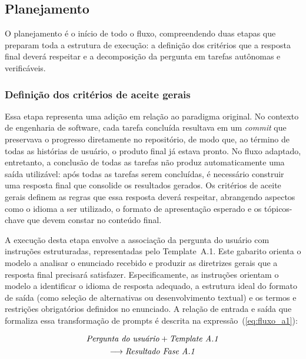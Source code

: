 \documentclass[a4paper,10pt,twocolumn]{article}
\begin{document}
\subsection{Planejamento}

O planejamento é o início de todo o fluxo, compreendendo duas etapas que preparam toda a estrutura de execução: a definição dos critérios que a resposta final deverá respeitar e a decomposição da pergunta em tarefas autônomas e verificáveis.


\subsubsection{Definição dos critérios de aceite gerais} \label{subsec:PlanejamentoA1}

Essa etapa representa uma adição em relação ao paradigma original. No contexto de engenharia de software, cada tarefa concluída resultava em um \textit{commit} que preservava o progresso diretamente no repositório, de modo que, ao término de todas as histórias de usuário, o produto final já estava pronto. No fluxo adaptado, entretanto, a conclusão de todas as tarefas não produz automaticamente uma saída utilizável: após todas as tarefas serem concluídas, é necessário construir uma resposta final que consolide os resultados gerados. Os critérios de aceite gerais definem as regras que essa resposta deverá respeitar, abrangendo aspectos como o idioma a ser utilizado, o formato de apresentação esperado e os tópicos-chave que devem constar no conteúdo final.

A execução desta etapa envolve a associação da pergunta do usuário com instruções estruturadas, representadas pelo Template~A.1. Este gabarito orienta o modelo a analisar o enunciado recebido e produzir as diretrizes gerais que a resposta final precisará satisfazer. Especificamente, as instruções orientam o modelo a identificar o idioma de resposta adequado, a estrutura ideal do formato de saída (como seleção de alternativas ou desenvolvimento textual) e os termos e restrições obrigatórios definidos no enunciado. A relação de entrada e saída que formaliza essa transformação de prompts é descrita na expressão~(\ref{eq:fluxo_a1}):

\begin{multline} \label{eq:fluxo_a1}
\text{\textit{Pergunta do usuário}} + \text{\textit{Template A.1}} \\
\longrightarrow \text{\textit{Resultado Fase A.1}}
\end{multline}
\end{document}
